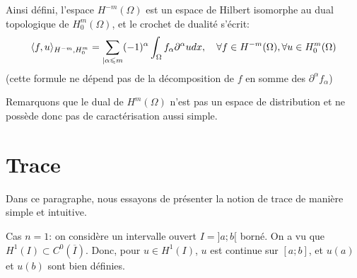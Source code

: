 \medskip
Ainsi défini, l'espace $H^{-m}(\Omega)$ est un espace de Hilbert isomorphe au dual
topologique de $H^m_0(\Omega)$, et le crochet de dualité s'écrit:
\begin{equation}
\langle f,u\rangle_{H^{-m},H_0^m} = \displaystyle\sum_{|\alpha\leqslant m} (-1)^\alpha \displaystyle\int_\Omega
f_\alpha \partial^\alpha u d x,
\quad \forall f\in H^{-m}(\Omega), \forall u\in H^m_0(\Omega)
\end{equation}
(cette formule ne dépend pas de la décomposition de $f$ en somme des $\partial^\alpha f_\alpha$)

\medskip
Remarquons que le dual de $H^m(\Omega)$ n'est pas un espace de distribution et ne possède
donc pas de caractérisation aussi simple.

\medskip
\section{Trace}

Dans ce paragraphe, nous essayons de présenter la notion de trace de manière simple et intuitive.

\medskip
{}

\medskip
Cas $n=1$:
on considère un intervalle ouvert $I =]a;b[$ borné. On a vu que $H^1(I)\subset C^0(\overline{I})$.
Donc, pour $u\in H^1(I)$, $u$ est continue sur $[a;b]$, et $u(a)$ et $u(b)$ sont bien définies.


